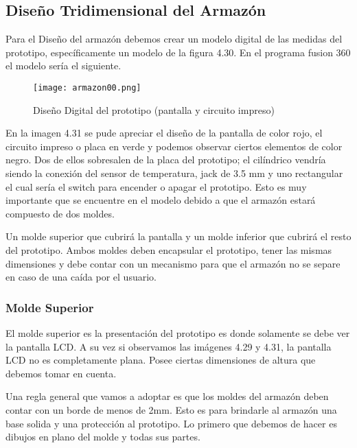 \subsection{Diseño Tridimensional del Armazón}

\par
Para el Diseño del armazón debemos crear un modelo digital de las medidas del prototipo, específicamente un modelo de la figura 4.30. En el programa fusion 360 el modelo sería el siguiente.

\begin{figure}[H]
	\centering
	\texttt{[image: armazon00.png]}
	\caption{Diseño Digital del prototipo (pantalla y circuito impreso)}
\end{figure}

\par \noindent
En la imagen 4.31 se pude apreciar el diseño de la pantalla de color rojo, el circuito impreso o placa en verde y podemos observar ciertos elementos de color negro. Dos de ellos sobresalen de la placa del prototipo; el cilíndrico vendría siendo la conexión del sensor de temperatura, jack de 3.5 mm y uno rectangular el cual sería el switch para encender o apagar el prototipo. Esto es muy importante que se encuentre en el modelo debido a que el armazón estará compuesto de dos moldes.  

\par \noindent
Un molde superior que cubrirá la pantalla y un molde inferior que cubrirá el resto del prototipo. Ambos moldes deben encapsular el prototipo, tener las mismas dimensiones y debe contar con un mecanismo para que el armazón no se separe en caso de una caída por el usuario.

\subsubsection{Molde Superior}

\par 
El molde superior es la presentación del prototipo es donde solamente se debe ver la pantalla LCD. A su vez si observamos las imágenes 4.29 y 4.31, la pantalla LCD no es completamente plana. Posee ciertas dimensiones de altura que debemos tomar en cuenta. 

\par \noindent
Una regla general que vamos a adoptar es que los moldes del armazón deben contar con un borde de menos de 2mm. Esto es para brindarle al armazón una base solida y una protección al prototipo. Lo primero que debemos de hacer es dibujos en plano del molde y todas sus partes.

